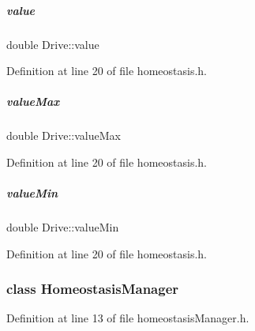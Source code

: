 \mbox{\label{group__homeostasis_a5417db9e7769d888db2bb0c293e78323}} 
\subparagraph{\texorpdfstring{value}{value}}
{\footnotesize\ttfamily double Drive\+::value}



Definition at line 20 of file homeostasis.\+h.

\mbox{\label{group__homeostasis_abe87b7fff815dd30f0deda945d851d4d}} 
\subparagraph{\texorpdfstring{value\+Max}{valueMax}}
{\footnotesize\ttfamily double Drive\+::value\+Max}



Definition at line 20 of file homeostasis.\+h.

\mbox{\label{group__homeostasis_ac15651cc5321e8b6a4458daeffb5d305}} 
\subparagraph{\texorpdfstring{value\+Min}{valueMin}}
{\footnotesize\ttfamily double Drive\+::value\+Min}



Definition at line 20 of file homeostasis.\+h.

\label{classHomeostasisManager}
\subsubsection{class Homeostasis\+Manager}


Definition at line 13 of file homeostasis\+Manager.\+h.

